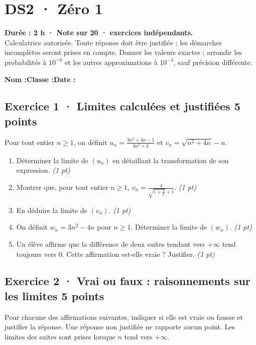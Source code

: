 \mxnewpage{}\label{sujet:2-1}

\section*{DS2 · Zéro 1}


\textbf{Durée : 2 h · Note sur 20 ·  exercices indépendants.}\\Calculatrice autorisée. Toute réponse doit être justifiée ; les démarches incomplètes seront prises en compte. Donner les valeurs exactes ; arrondir les probabilités à $10^{-6}$ et les autres approximations à $10^{-4}$, sauf précision différente.

\smallskip\textbf{Nom :}\enspace\dotfill\quad\textbf{Classe :}\enspace\dotfill\quad\textbf{Date :}\enspace\dotfill

\subsection*{Exercice 1 · Limites calculées et justifiées \hfill 5 points}Pour tout entier $n\ge1$, on définit $u_n=\frac{3n^2+4n-1}{4n^2+3}$ et $v_n=\sqrt{n^2+4n}-n$.

\begin{enumerate}

\item Déterminer la limite de $(u_n)$ en détaillant la transformation de son expression. \hfill\textit{(1 pt)}

\item Montrer que, pour tout entier $n\ge1$, $v_n=\frac{4}{\sqrt{1+\frac{4}n}+1}$. \hfill\textit{(1 pt)}

\item En déduire la limite de $(v_n)$. \hfill\textit{(1 pt)}

\item On définit $w_n=3n^2-4n$ pour $n\ge1$. Déterminer la limite de $(w_n)$. \hfill\textit{(1 pt)}

\item Un élève affirme que la différence de deux suites tendant vers $+\infty$ tend toujours vers $0$. Cette affirmation est-elle vraie ? Justifier. \hfill\textit{(1 pt)}

\end{enumerate}

\subsection*{Exercice 2 · Vrai ou faux : raisonnements sur les limites \hfill 5 points}Pour chacune des affirmations suivantes, indiquer si elle est vraie ou fausse et justifier la réponse. Une réponse non justifiée ne rapporte aucun point. Les limites des suites sont prises lorsque $n$ tend vers $+\infty$.

